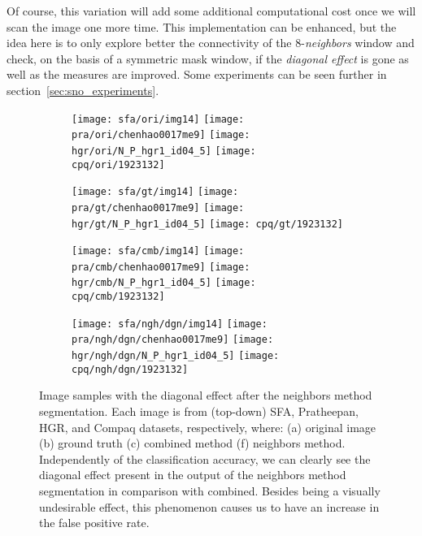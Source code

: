 Of course, this variation will add some additional computational cost once we will scan the image one more time. This implementation can be enhanced, but the idea here is to only explore better the connectivity of the 8-\textit{neighbors} window and check, on the basis of a symmetric mask window, if the \textit{diagonal effect} is gone as well as the measures are improved. Some experiments can be seen further in section~\ref{sec:sno_experiments}.

\begin{figure*}[!htb]
    \centering
    \begin{subfigure}[t]{0.18\textwidth}
        \texttt{[image: sfa/ori/img14]}
        \texttt{[image: pra/ori/chenhao0017me9]}
        \texttt{[image: hgr/ori/N\_P\_hgr1\_id04\_5]}
        \texttt{[image: cpq/ori/1923132]}
        \caption{}
    \end{subfigure}
    \begin{subfigure}[t]{0.18\textwidth}
        \texttt{[image: sfa/gt/img14]}
        \texttt{[image: pra/gt/chenhao0017me9]}
        \texttt{[image: hgr/gt/N\_P\_hgr1\_id04\_5]}
        \texttt{[image: cpq/gt/1923132]}
        \caption{}
    \end{subfigure}
    \begin{subfigure}[t]{0.18\textwidth}
        \texttt{[image: sfa/cmb/img14]}
        \texttt{[image: pra/cmb/chenhao0017me9]}
        \texttt{[image: hgr/cmb/N\_P\_hgr1\_id04\_5]}
        \texttt{[image: cpq/cmb/1923132]}
        \caption{}
    \end{subfigure}
    \begin{subfigure}[t]{0.18\textwidth}
        \texttt{[image: sfa/ngh/dgn/img14]}
        \texttt{[image: pra/ngh/dgn/chenhao0017me9]}
        \texttt{[image: hgr/ngh/dgn/N\_P\_hgr1\_id04\_5]}
        \texttt{[image: cpq/ngh/dgn/1923132]}
        \caption{}
    \end{subfigure}

    \caption[Image samples with the diagonal effect after the neighbors method segmentation]{Image samples with the diagonal effect after the neighbors method segmentation. Each image is from (top-down) SFA, Pratheepan, HGR, and Compaq datasets, respectively, where: (a) original image (b) ground truth (c) combined method (f) neighbors method. Independently of the classification accuracy, we can clearly see the diagonal effect present in the output of the neighbors method segmentation in comparison with combined. Besides being a visually undesirable effect, this phenomenon causes us to have an increase in the false positive rate.}
    \label{fig:diagonal_effect}
\end{figure*}

